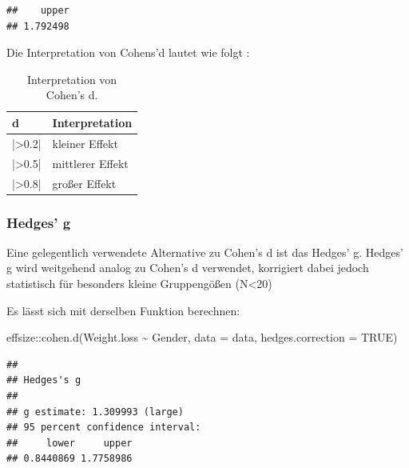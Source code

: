 \documentclass[
]{book}
\newenvironment{Shaded}{\begin{snugshade}}{\end{snugshade}}
\newcommand{\AttributeTok}[1]{\textcolor[rgb]{0.77,0.63,0.00}{#1}}
\newcommand{\ConstantTok}[1]{\textcolor[rgb]{0.00,0.00,0.00}{#1}}
\newcommand{\FunctionTok}[1]{\textcolor[rgb]{0.00,0.00,0.00}{#1}}
\newcommand{\NormalTok}[1]{#1}
\newcommand{\SpecialCharTok}[1]{\textcolor[rgb]{0.00,0.00,0.00}{#1}}
\begin{document}
\begin{verbatim}
##    upper 
## 1.792498
\end{verbatim}

Die Interpretation von Cohens'd lautet wie folgt \citet{cohen1992quantitative}:

\begin{table}[tbp]

\begin{center}
\begin{threeparttable}

\caption{\label{tab:unnamed-chunk-244}Interpretation von Cohen's d.}

\begin{tabular}{ll}
\toprule
d & \multicolumn{1}{c}{Interpretation}\\
\midrule
|>0.2| & kleiner Effekt\\
|>0.5| & mittlerer Effekt\\
|>0.8| & großer Effekt\\
\bottomrule
\end{tabular}

\end{threeparttable}
\end{center}

\end{table}

\hypertarget{hedges-g}{%
\subsubsection{Hedges' g}\label{hedges-g}}

Eine gelegentlich verwendete Alternative zu Cohen's d ist das Hedges' g. Hedges' g wird weitgehend analog zu Cohen's d verwendet, korrigiert dabei jedoch statistisch für besonders kleine Gruppengößen (N\textless20) \citet{hedges2014statistical}

Es lässt sich mit derselben Funktion berechnen:

\begin{Shaded}
\begin{Highlighting}[]
\NormalTok{effsize}\SpecialCharTok{::}\FunctionTok{cohen.d}\NormalTok{(Weight.loss }\SpecialCharTok{\textasciitilde{}}\NormalTok{ Gender, }\AttributeTok{data =}\NormalTok{ data, }\AttributeTok{hedges.correction =} \ConstantTok{TRUE}\NormalTok{)}
\end{Highlighting}
\end{Shaded}

\begin{verbatim}
## 
## Hedges's g
## 
## g estimate: 1.309993 (large)
## 95 percent confidence interval:
##     lower     upper 
## 0.8440869 1.7758986
\end{verbatim}
\end{document}
